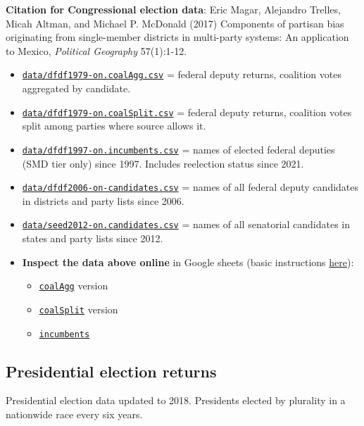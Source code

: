 \documentclass[11pt]{article}
\begin{document}
\textbf{Citation for Congressional election data}: Eric Magar, Alejandro Trelles, Micah Altman, and Michael P. McDonald (2017) Components of partisan bias originating from single-member districts in multi-party systems: An application to Mexico, \emph{Political Geography} 57(1):1-12. 
\begin{itemize}
\item \href{./data/dfdf1979-on.coalAgg.csv}{\texttt{data/dfdf1979-on.coalAgg.csv}}     = federal deputy returns, coalition votes aggregated by candidate.
\item \href{./data/dfdf1979-on.coalSplit.csv}{\texttt{data/dfdf1979-on.coalSplit.csv}}   = federal deputy returns, coalition votes split among parties where source allows it.
\item \href{./data/dfdf1979-on.coalSplit.csv}{\texttt{data/dfdf1997-on.incumbents.csv}}  = names of elected federal deputies (SMD tier only) since 1997. Includes reelection status since 2021.
\item \href{./data/dfdf2006-on-candidates.csv}{\texttt{data/dfdf2006-on-candidates.csv}}  = names of all federal deputy candidates in districts and party lists since 2006.
\item \href{./data/seed2012-on.candidates.csv}{\texttt{data/seed2012-on.candidates.csv}}  = names of all senatorial candidates in states and party lists since 2012.
\item \textbf{Inspect the data above online} in Google sheets (basic instructions \hyperref[org0025864]{here}):
\begin{itemize}
\item \href{https://docs.google.com/spreadsheets/d/1cUfi1BlpVVeBKo-vI2lbQAwtUGpGFlGAqcdHZ01BtRo/copy}{\texttt{coalAgg}} version
\item \href{https://docs.google.com/spreadsheets/d/1c57io0aooj54elYxw2Ya0QO1\_tRWd-QWadKYCLU3CiA/copy}{\texttt{coalSplit}} version
\item \href{https://docs.google.com/spreadsheets/d/1r6BER0cmm4MNwNiy7ZdAwALzQn9QiEGg\_9TfALumbPU/copy}{\texttt{incumbents}}
\end{itemize}
\end{itemize}
\subsection{Presidential election returns}
\label{sec:orgd7d8774}
Presidential election data updated to 2018. Presidents elected by plurality in a nationwide race every six years.
\end{document}
